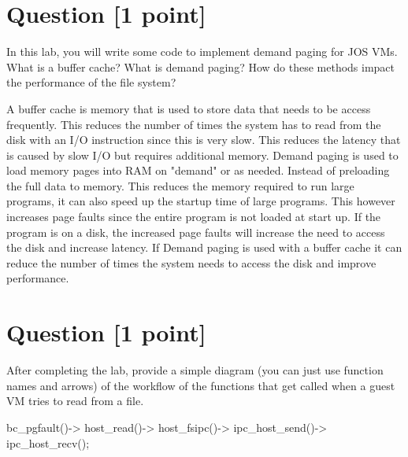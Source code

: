 \documentclass[11pt]{article}
\begin{document}
\section{Question [1 point]}

In this lab, you will write some code to implement demand paging for JOS VMs. What is a buffer cache? What is demand paging? How do these methods impact the performance of the file system?

\begin{solution}
A buffer cache is memory that is used to store data that needs to be access frequently.
This reduces the number of times the system has to read from the disk with an I/O instruction since this is very slow.
This reduces the latency that is caused by slow I/O but requires additional memory.
Demand paging is used to load memory pages into RAM on "demand" or as needed. Instead of preloading the full data to memory.
This reduces the memory required to run large programs, it can also speed up the startup time of large programs.
This however increases page faults since the entire program is not loaded at start up. If the program is on a disk, the increased page faults will increase the need to access the disk and increase latency. 
If Demand paging is used with a buffer cache it can reduce the number of times the system needs to access the disk and improve performance.
\end{solution}


\section{Question [1 point]}

After completing the lab, provide a simple diagram (you can just use function names and arrows) 
of the workflow of the functions that get called when a guest VM tries to read from a file.

\begin{solution}
bc_pgfault()->
host_read()->
host_fsipc()->
ipc_host_send()->
ipc_host_recv();
\end{solution}
\end{document}
